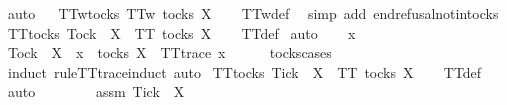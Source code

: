 \begin{isabellebody}
\ auto%
\endisatagproof
{\isafoldproof}%
%
\isadelimproof
\ \isanewline
%
\endisadelimproof
\isanewline
{}\isamarkupfalse%
\ TT{}w{\isacharunderscore}tocks{\isacharcolon}\ {\isachardoublequoteopen}TT{}w\ {\isacharparenleft}tocks\ X{\isacharparenright}{\isachardoublequoteclose}\isanewline
%
\isadelimproof
\ \ %
\endisadelimproof
%
\isatagproof
{}\isamarkupfalse%
\ TT{}w{\isacharunderscore}def\ \isamarkupfalse%
\ {\isacharparenleft}simp\ add{\isacharcolon}\ end{\isacharunderscore}refusal{\isacharunderscore}notin{\isacharunderscore}tocks{\isacharparenright}%
\endisatagproof
{\isafoldproof}%
%
\isadelimproof
\isanewline
%
\endisadelimproof
\isanewline
{}\isamarkupfalse%
\ TT{}{\isacharunderscore}tocks{\isacharcolon}\ {\isachardoublequoteopen}Tock\ {\isasymnotin}\ X\ {\isasymLongrightarrow}\ TT{}\ {\isacharparenleft}tocks\ X{\isacharparenright}{\isachardoublequoteclose}\isanewline
%
\isadelimproof
\ \ %
\endisadelimproof
%
\isatagproof
{}\isamarkupfalse%
\ TT{}{\isacharunderscore}def\isanewline
{}\isamarkupfalse%
\ auto\isanewline
\ \ \isamarkupfalse%
\ x\isanewline
\ \ \isamarkupfalse%
\ {\isachardoublequoteopen}Tock\ {\isasymnotin}\ X\ {\isasymLongrightarrow}\ x\ {\isasymin}\ tocks\ X\ {\isasymLongrightarrow}\ TT{}{\isacharunderscore}trace\ x{\isachardoublequoteclose}\isanewline
\ \ \ \ \isamarkupfalse%
\ tocks{\isachardot}cases\ \isamarkupfalse%
\ {\isacharparenleft}induct\ rule{\isacharcolon}TT{}{\isacharunderscore}trace{\isachardot}induct{\isacharcomma}\ auto{\isacharparenright}\isanewline
{}\isamarkupfalse%
%
\endisatagproof
{\isafoldproof}%
%
\isadelimproof
\isanewline
%
\endisadelimproof
\isanewline
{}\isamarkupfalse%
\ TT{}{\isacharunderscore}tocks{\isacharcolon}\ {\isachardoublequoteopen}Tick\ {\isasymin}\ X\ {\isasymLongrightarrow}\ TT{}\ {\isacharparenleft}tocks\ X{\isacharparenright}{\isachardoublequoteclose}\isanewline
%
\isadelimproof
\ \ %
\endisadelimproof
%
\isatagproof
{}\isamarkupfalse%
\ TT{}{\isacharunderscore}def\isanewline
{}\isamarkupfalse%
\ auto\isanewline
\ \ \isamarkupfalse%
\ {\isasymrho}\isanewline
\ \ \isamarkupfalse%
\ assm{\isacharcolon}\ {\isachardoublequoteopen}Tick\ {\isasymin}\ X{\isachardoublequoteclose}\isanewline
\ \ \isamarkupfalse%

\end{isabellebody}
